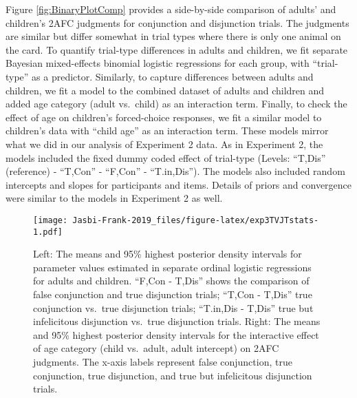 \documentclass[
  english,
  ,man,floatsintext]{apa6}
\begin{document}
Figure \ref{fig:BinaryPlotComp} provides a side-by-side comparison of adults' and children's 2AFC judgments for conjunction and disjunction trials. The judgments are similar but differ somewhat in trial types where there is only one animal on the card. To quantify trial-type differences in adults and children, we fit separate Bayesian mixed-effects binomial logistic regressions for each group, with \enquote{trial-type} as a predictor. Similarly, to capture differences between adults and children, we fit a model to the combined dataset of adults and children and added age category (adult vs.~child) as an interaction term. Finally, to check the effect of age on children's forced-choice responses, we fit a similar model to children's data with \enquote{child age} as an interaction term. These models mirror what we did in our analysis of Experiment 2 data. As in Experiment 2, the models included the fixed dummy coded effect of trial-type (Levels: \enquote{T,Dis} (reference) - \enquote{T,Con} - \enquote{F,Con} - \enquote{T.in,Dis}). The models also included random intercepts and slopes for participants and items. Details of priors and convergence were similar to the models in Experiment 2 as well.

\begin{figure}
\centering
\texttt{[image: Jasbi-Frank-2019\_files/figure-latex/exp3TVJTstats-1.pdf]}
\caption{\label{fig:exp3TVJTstats}Left: The means and 95\% highest posterior density intervals for parameter values estimated in separate ordinal logistic regressions for adults and children. \enquote{F,Con - T,Dis} shows the comparison of false conjunction and true disjunction trials; \enquote{T,Con - T,Dis} true conjunction vs.~true disjunction trials; \enquote{T.in,Dis - T,Dis} true but infelicitous disjunction vs.~true disjunction trials. Right: The means and 95\% highest posterior density intervals for the interactive effect of age category (child vs.~adult, adult intercept) on 2AFC judgments. The x-axis labels represent false conjunction, true conjunction, true disjunction, and true but infelicitous disjunction trials.}
\end{figure}
\end{document}
